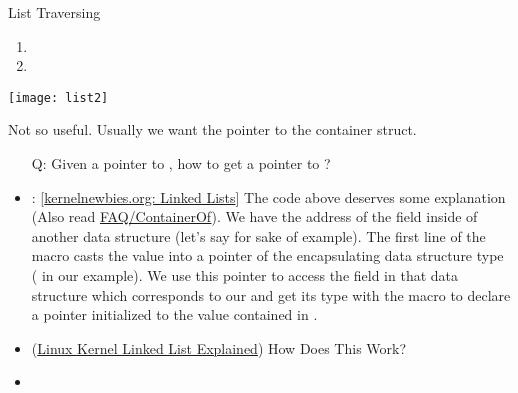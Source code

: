 \begin{frame}{List Traversing}
  \begin{enumerate}
  \item {}
  \item {}
  \end{enumerate}
  \begin{block}{}
    \begin{center}
      \texttt{[image: list2]}
    \end{center}
  \end{block}
  Not so useful. Usually we want the pointer to the container struct.
\end{frame}

\begin{frame}
  \begin{center}
     
  \end{center}
  \begin{itemize}
  \item[Q:] Given a pointer to , how to get a pointer to ?
    \begin{center}
    \end{center}
  \end{itemize}
  \begin{block}{}
    \begin{center}
       
    \end{center}
  \end{block}
\end{frame}

\begin{itemize}
\item {}:
  [\href{http://kernelnewbies.org/FAQ/LinkedLists}{kernelnewbies.org: Linked Lists}] The
  code above deserves some explanation (Also read
  \href{http://kernelnewbies.org/FAQ/ContainerOf}{FAQ/ContainerOf}). We have the address
  of the  field inside of another data structure (let's say
   for sake of example). The first line of the macro casts the
  value  into a pointer of the encapsulating data structure type ( in our example). We use this pointer to access the field in that data
  structure which corresponds to our  and get its type with the macro
   to declare a pointer  initialized to the value contained in
  .
\item (\href{http://isis.poly.edu/kulesh/stuff/src/klist/}{Linux Kernel Linked List
    Explained}) How Does This Work?
\item
  \href{http://adrianhuang.blogspot.com/2007/10/linux-kernel-listhead.html}{}
\end{itemize}

